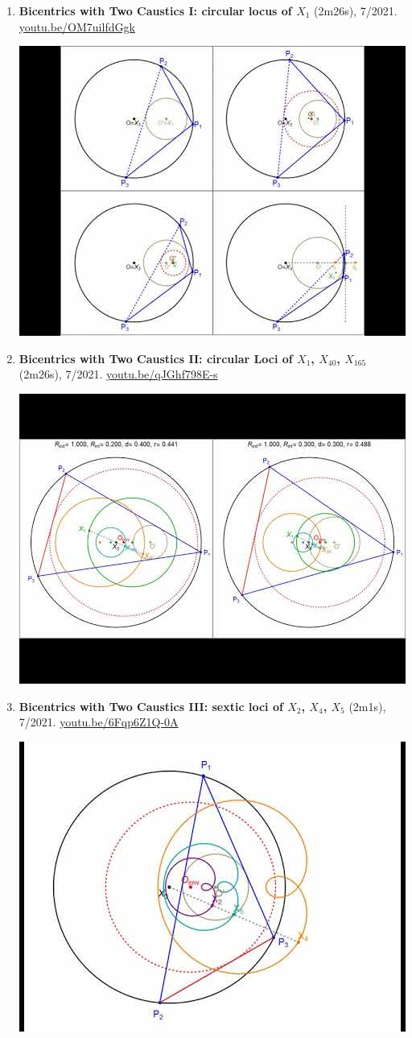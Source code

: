 \documentclass[12pt]{article}
\begin{document}
\begin{enumerate}[resume]
\item \textbf{Bicentrics with Two Caustics I: circular locus of $X_{1}$} (2m26s), 7/2021. \href{https://youtu.be/OM7uilfdGgk}{\url{youtu.be/OM7uilfdGgk}}
\begin{center}\includegraphics[width=.5\textwidth]{pics/OM7uilfdGgk.jpg}\end{center}
% 
\item \textbf{Bicentrics with Two Caustics II: circular Loci of $X_{1}$, $X_{40}$, $X_{165}$} (2m26s), 7/2021. \href{https://youtu.be/qJGhf798E-s}{\url{youtu.be/qJGhf798E-s}}
\begin{center}\includegraphics[width=.5\textwidth]{pics/qJGhf798E-s.jpg}\end{center}
% 
\item \textbf{Bicentrics with Two Caustics III: sextic loci of $X_{2}$, $X_{4}$, $X_{5}$} (2m1s), 7/2021. \href{https://youtu.be/6Fqp6Z1Q-0A}{\url{youtu.be/6Fqp6Z1Q-0A}}
\begin{center}\includegraphics[width=.5\textwidth]{pics/6Fqp6Z1Q-0A.jpg}\end{center}

\end{enumerate}
\end{document}
